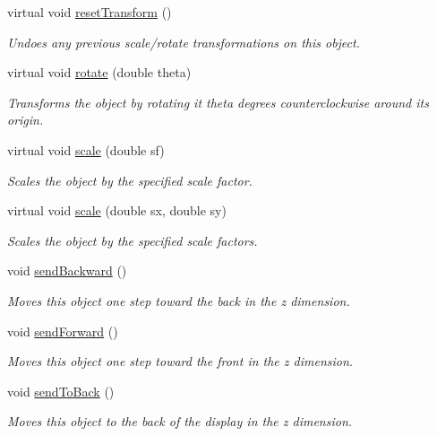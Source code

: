 \begin{DoxyCompactItemize}
virtual void \mbox{\hyperlink{classGObject_a6022a1fd1e5dcd2fd5585e5a36aa3f37}{reset\+Transform}} ()
\begin{DoxyCompactList}\small\item\em Undoes any previous scale/rotate transformations on this object. \end{DoxyCompactList}\item 
virtual void \mbox{\hyperlink{classGObject_ae1ffaa12185dfd5ba464f7d87c329e26}{rotate}} (double theta)
\begin{DoxyCompactList}\small\item\em Transforms the object by rotating it {\ttfamily theta} degrees counterclockwise around its origin. \end{DoxyCompactList}\item 
virtual void \mbox{\hyperlink{classGObject_ad2e1900f730475c2d044817db03b38d6}{scale}} (double sf)
\begin{DoxyCompactList}\small\item\em Scales the object by the specified scale factor. \end{DoxyCompactList}\item 
virtual void \mbox{\hyperlink{classGObject_a63641f69d610d0b951357d35a0c3b1e3}{scale}} (double sx, double sy)
\begin{DoxyCompactList}\small\item\em Scales the object by the specified scale factors. \end{DoxyCompactList}\item 
void \mbox{\hyperlink{classGObject_ab6747f40313c531c2db32edb5b63b9b7}{send\+Backward}} ()
\begin{DoxyCompactList}\small\item\em Moves this object one step toward the back in the {\itshape z} dimension. \end{DoxyCompactList}\item 
void \mbox{\hyperlink{classGObject_a710b3e449c9facba7847c91ab170d281}{send\+Forward}} ()
\begin{DoxyCompactList}\small\item\em Moves this object one step toward the front in the {\itshape z} dimension. \end{DoxyCompactList}\item 
void \mbox{\hyperlink{classGObject_a0f7f1efbb7fd46dde2867c4ad0330896}{send\+To\+Back}} ()
\begin{DoxyCompactList}\small\item\em Moves this object to the back of the display in the {\itshape z} dimension. \end{DoxyCompactList}\item 

\end{DoxyCompactItemize}
